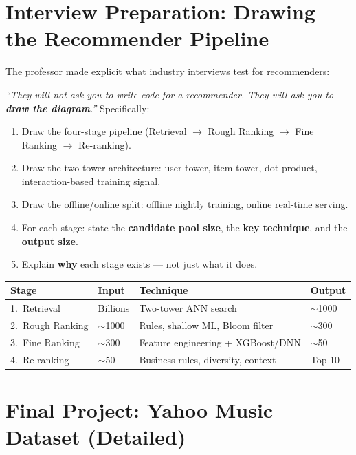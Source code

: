 \documentclass[11pt]{article}
\begin{document}
\newpage
\section{Interview Preparation: Drawing the Recommender Pipeline}

The professor made explicit what industry interviews test for recommenders:

\textit{``They will not ask you to write code for a recommender. They will
ask you to \textbf{draw the diagram}.''} Specifically:

\begin{enumerate}
    \item Draw the four-stage pipeline (Retrieval $\to$ Rough Ranking
      $\to$ Fine Ranking $\to$ Re-ranking).
    \item Draw the two-tower architecture: user tower, item tower,
      dot product, interaction-based training signal.
    \item Draw the offline/online split: offline nightly training,
      online real-time serving.
    \item For each stage: state the \textbf{candidate pool size}, the
      \textbf{key technique}, and the \textbf{output size}.
    \item Explain \textbf{why} each stage exists --- not just what it does.
\end{enumerate}

\begin{center}
\begin{tabular}{@{}llll@{}}
\toprule
\textbf{Stage} & \textbf{Input} & \textbf{Technique} & \textbf{Output} \\
\midrule
1.\ Retrieval       & Billions & Two-tower ANN search & $\sim$1000 \\
2.\ Rough Ranking   & $\sim$1000 & Rules, shallow ML, Bloom filter & $\sim$300 \\
3.\ Fine Ranking    & $\sim$300 & Feature engineering + XGBoost/DNN & $\sim$50 \\
4.\ Re-ranking      & $\sim$50 & Business rules, diversity, context & Top 10 \\
\bottomrule
\end{tabular}
\end{center}


\newpage
\section{Final Project: Yahoo Music Dataset (Detailed)}
\end{document}
